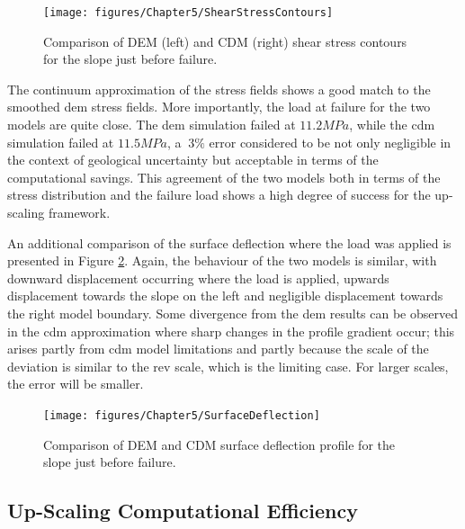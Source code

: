 \begin{figure}[!htb]
\begin{center}
\texttt{[image: figures/Chapter5/ShearStressContours]}
\caption{{\label{fig:S12DNS} Comparison of DEM (left) and CDM (right) shear stress contours for the slope just before failure.%
}}
\end{center}
\end{figure}

The continuum approximation of the stress fields shows a good match to the smoothed \acrshort{dem} stress fields. More importantly, the load at failure for the two models are quite close. The \acrshort{dem} simulation failed at $11.2 MPa$, while the \acrshort{cdm} simulation failed at $11.5 MPa$, a $~3\%$ error considered to be not only negligible in the context of geological uncertainty but acceptable in terms of the computational savings. This agreement of the two models both in terms of the stress distribution and the failure load shows a high degree of success for the up-scaling framework. 

An additional comparison of the surface deflection where the load was applied is presented in Figure \ref{fig:surfacedeflection}. Again, the behaviour of the two models is similar, with downward displacement occurring where the load is applied, upwards displacement towards the slope on the left and negligible displacement towards the right model boundary. Some divergence from  the \acrshort{dem} results can be observed in the \acrshort{cdm} approximation where sharp changes in the profile gradient occur; this arises partly from \acrshort{cdm} model limitations and partly because the scale of the deviation is similar to the \acrshort{rev} scale, which is the limiting case. For larger scales, the error will be smaller.

\begin{figure}[!htb]
\begin{center}
\texttt{[image: figures/Chapter5/SurfaceDeflection]}
\caption{{\label{fig:surfacedeflection} Comparison of DEM and CDM surface deflection profile for the slope just before failure.%
}}
\end{center}
\end{figure}

\subsection{Up-Scaling Computational Efficiency}

